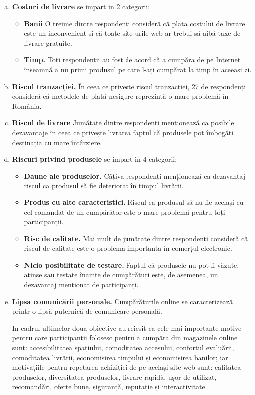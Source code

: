 \documentclass[a4paper, 12pt]{article}
\begin{document}
	\begin{enumerate}[a.]
		\item \textbf {Costuri de livrare} se impart in 2 categorii:
	\begin{itemize}
		\item\textbf{Banii} O treime dintre respondenți consideră că plata costului de livrare este un inconvenient și că toate site-urile web ar trebui să aibă taxe de livrare gratuite.
		\item\textbf{Timp.} Toți respondenții au fost de acord că a cumpăra de pe Internet înseamnă a nu primi produsul pe care l-ați cumpărat la timp în aceeași zi.
	\end{itemize}
	\item\textbf{Riscul tranzacției.} În ceea ce privește riscul tranzacției, 27 de respondenți consideră că metodele de plată nesigure reprezintă o mare problemă în România.
	\item\textbf {Riscul de livrare}
		Jumătate dintre respondenți menționează ca posibile dezavantaje în ceea ce privește livrarea faptul că produsele pot îmbogăți destinația cu mare întârziere.
	\item\textbf{Riscuri privind produsele} se impart in 4 categorii:
	\begin{itemize}
	\item \textbf{Daune ale produselor.} Câțiva respondenți menționează ca dezavantaj riscul ca produsul să fie deteriorat în timpul livrării.
	\item\textbf{Produs cu alte caracteristici.} Riscul ca produsul să nu fie același cu cel comandat de un cumpărător este o mare problemă pentru toți participanții.
	\item\textbf{Risc de calitate.} Mai mult de jumătate dintre respondenți consideră că riscul de calitate este o problema importanta în comerțul electronic.
	\item\textbf{Nicio posibilitate de testare.} Faptul că produsele nu pot fi văzute, atinse sau testate înainte de cumpărături este, de asemenea, un dezavantaj menționat de participanți.
	\end{itemize}
	\item\textbf{Lipsa comunicării personale.}
		Cumpărăturile online se caracterizează printr-o lipsă puternică de comunicare personală.
		
		\quad In cadrul ultimelor doua obiective au reiesit ca cele mai importante motive pentru care participanții folosesc pentru a cumpăra din magazinele online sunt: accesibilitatea spațiului, comoditatea accesului, confortul evaluării, comoditatea livrării, economisirea timpului și economisirea banilor; iar motivațiile pentru repetarea achiziției de pe același site web sunt: calitatea produselor, diversitatea produselor, livrare rapidă, ușor de utilizat, recomandări, oferte bune, siguranță, reputație și interactivitate.
	\end{enumerate}
		
\end{document}
